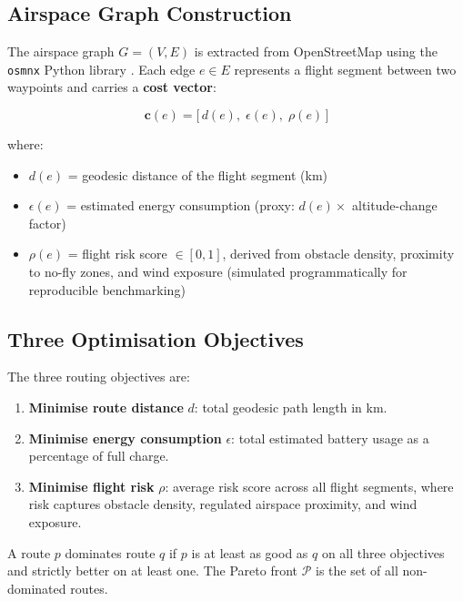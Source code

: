 \subsection{Airspace Graph Construction}

The airspace graph $G = (V, E)$ is extracted from OpenStreetMap using the
\texttt{osmnx} Python library \cite{osmnx}. Each edge $e \in E$ represents a flight
segment between two waypoints and carries a \textbf{cost vector}:

\begin{equation}
  \mathbf{c}(e) = \bigl[\, d(e),\; \epsilon(e),\; \rho(e) \,\bigr]
\end{equation}

where:
\begin{itemize}
  \item $d(e)$ = geodesic distance of the flight segment (km)
  \item $\epsilon(e)$ = estimated energy consumption (proxy: $d(e) \times$ altitude-change
        factor)
  \item $\rho(e)$ = flight risk score $\in [0, 1]$, derived from obstacle density,
        proximity to no-fly zones, and wind exposure (simulated programmatically for
        reproducible benchmarking)
\end{itemize}

\subsection{Three Optimisation Objectives}

The three routing objectives are:

\begin{enumerate}
  \item \textbf{Minimise route distance} $d$: total geodesic path length in km.
  \item \textbf{Minimise energy consumption} $\epsilon$: total estimated battery usage
        as a percentage of full charge.
  \item \textbf{Minimise flight risk} $\rho$: average risk score across all flight
        segments, where risk captures obstacle density, regulated airspace proximity,
        and wind exposure.
\end{enumerate}

A route $p$ dominates route $q$ if $p$ is at least as good as $q$ on all three
objectives and strictly better on at least one. The Pareto front $\mathcal{P}$ is the
set of all non-dominated routes.

